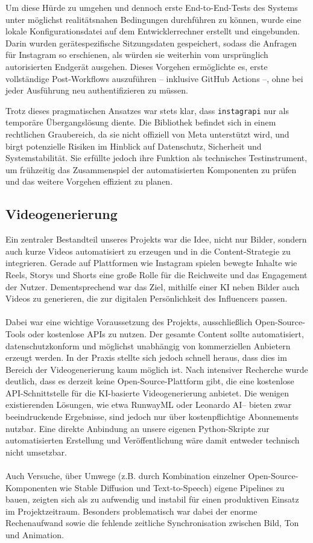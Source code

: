 \documentclass[a4paper,12pt]{article}
\begin{document}
Um diese Hürde zu umgehen und dennoch erste End-to-End-Tests des Systems unter möglichst realitätsnahen Bedingungen durchführen zu können, wurde eine lokale Konfigurationsdatei auf dem Entwicklerrechner erstellt und eingebunden. Darin wurden gerätespezifische Sitzungsdaten gespeichert, sodass die Anfragen für Instagram so erschienen, als würden sie weiterhin vom ursprünglich autorisierten Endgerät ausgehen. Dieses Vorgehen ermöglichte es, erste vollständige Post-Workflows auszuführen – inklusive GitHub Actions –, ohne bei jeder Ausführung neu authentifizieren zu müssen.

Trotz dieses pragmatischen Ansatzes war stets klar, dass \texttt{instagrapi} nur als temporäre Übergangslösung diente. Die Bibliothek befindet sich in einem rechtlichen Graubereich, da sie nicht offiziell von Meta unterstützt wird, und birgt potenzielle Risiken im Hinblick auf Datenschutz, Sicherheit und Systemstabilität. Sie erfüllte jedoch ihre Funktion als technisches Testinstrument, um frühzeitig das Zusammenspiel der automatisierten Komponenten zu prüfen und das weitere Vorgehen effizient zu planen.


\subsection{Videogenerierung}

Ein zentraler Bestandteil unseres Projekts war die Idee, nicht nur Bilder, sondern auch kurze Videos automatisiert zu erzeugen und in die Content-Strategie zu integrieren. Gerade auf Plattformen wie Instagram spielen bewegte Inhalte wie Reels, Storys und Shorts eine große Rolle für die Reichweite und das Engagement der Nutzer. Dementsprechend war das Ziel, mithilfe einer KI neben Bilder auch Videos zu generieren, die zur digitalen Persönlichkeit des Influencers passen. \\\\
Dabei war eine wichtige Voraussetzung des Projekts, ausschließlich Open-Source-Tools oder kostenlose APIs zu nutzen. Der gesamte Content sollte automatisiert, datenschutzkonform und möglichst unabhängig von kommerziellen Anbietern erzeugt werden. In der Praxis stellte sich jedoch schnell heraus, dass dies im Bereich der Videogenerierung kaum möglich ist.
Nach intensiver Recherche wurde deutlich, dass es derzeit keine Open-Source-Plattform gibt, die eine kostenlose API-Schnittstelle für die KI-basierte Videogenerierung anbietet. Die wenigen existierenden Lösungen, wie etwa RunwayML oder Leonardo AI– bieten zwar beeindruckende Ergebnisse, sind jedoch nur über kostenpflichtige Abonnements nutzbar. Eine direkte Anbindung an unsere eigenen Python-Skripte zur automatisierten Erstellung und Veröffentlichung wäre damit entweder technisch nicht umsetzbar. \\\\
Auch Versuche, über Umwege (z.B. durch Kombination einzelner Open-Source-Komponenten wie Stable Diffusion und Text-to-Speech) eigene Pipelines zu bauen, zeigten sich als zu aufwendig und instabil für einen produktiven Einsatz im Projektzeitraum. Besonders problematisch war dabei der enorme Rechenaufwand sowie die fehlende zeitliche Synchronisation zwischen Bild, Ton und Animation.
\end{document}
